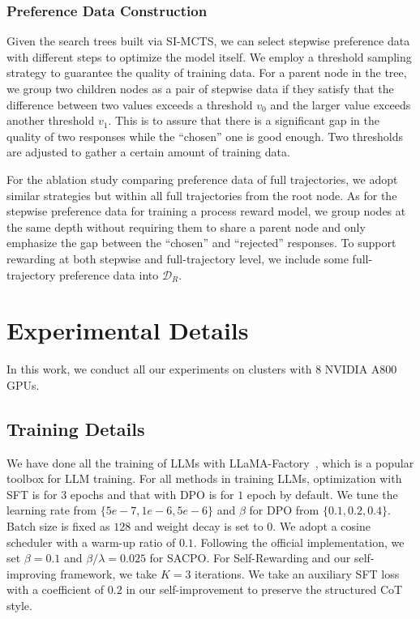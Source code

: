 \subsubsection{Preference Data Construction} 

Given the search trees built via SI-MCTS, we can select stepwise preference data with different steps to optimize the model itself. We employ a threshold sampling strategy to guarantee the quality of training data. For a parent node in the tree, we group two children nodes as a pair of stepwise data if they satisfy that the difference between two values exceeds a threshold $v_0$ and the larger value exceeds another threshold $v_1$. This is to assure that there is a significant gap in the quality of two responses while the ``chosen'' one is good enough. Two thresholds are adjusted to gather a certain amount of training data. 

For the ablation study comparing preference data of full trajectories, we adopt similar strategies but within all full trajectories from the root node. As for the stepwise preference data for training a process reward model, we group nodes at the same depth without requiring them to share a parent node and only emphasize the gap between the ``chosen'' and ``rejected'' responses. To support rewarding at both stepwise and full-trajectory level, we include some full-trajectory preference data into $\mathcal{D}_R$.


\section{Experimental Details}
\label{sec:appendix_exp}

In this work, we conduct all our experiments on clusters with 8 NVIDIA A800 GPUs. 

\subsection{Training Details}
\label{sec:appendix_train}

We have done all the training of LLMs with LLaMA-Factory~\cite{zheng2024llamafactory}, which is a popular toolbox for LLM training. For all methods in training LLMs, optimization with SFT is for $3$ epochs and that with DPO is for $1$ epoch by default. We tune the learning rate from $\{5e-7, 1e-6, 5e-6\}$ and $\beta$ for DPO from $\{0.1,0.2,0.4\}$. Batch size is fixed as $128$ and weight decay is set to $0$. We adopt a cosine scheduler with a warm-up ratio of $0.1$. Following the official implementation, we set $\beta=0.1$ and $\beta/\lambda=0.025$ for SACPO. For Self-Rewarding and our self-improving framework, we take $K=3$ iterations. We take an auxiliary SFT loss with a coefficient of $0.2$ in our self-improvement to preserve the structured CoT style. 

